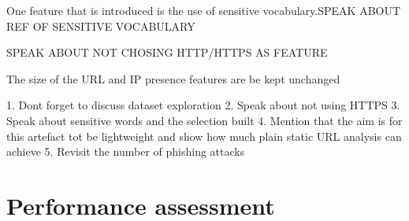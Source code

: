 One feature that is introduced is the use of sensitive vocabulary.SPEAK ABOUT REF OF SENSITIVE VOCABULARY

SPEAK ABOUT NOT CHOSING HTTP/HTTPS AS FEATURE

The size of the URL and IP presence features are be kept unchanged


1. Dont forget to discuss dataset exploration
2. Speak about not using HTTPS
3. Speak about sensitive words and the selection built
4. Mention that the aim is for this artefact tot be lightweight and show how much plain static URL analysis can achieve
5. Revisit the number of phishing attacks

\section{Performance assessment}


\iffalse
You should always start with an overview (Heading 2 style) to tell what this chapter is about and finish with a summary (Heading 2 style) to tell what has been covered in this chapter.

The Design and Implementation chapter should explain the design technique chosen and justify why it is appropriate, depending on the development methodology.  Suitable diagram-techniques (e.g. UML, other drawings) should be used where appropriate. For the Implementation part, it should talk about the technical realisation of the concepts and ideas developed earlier. It is used to describe the system at a finer level of technical details, down to the code level. However, do not attempt to describe all the code in the system, and do not include large pieces of code in this section. 

You should highlight the pieces of code which are critical to the system or worth to be noted. For example, the creation and/or implementation of core algorithms that make the system functional or some methods/ways you have used which are non-standard or innovative in the system implementation. You should also mention any unforeseen problems you encountered when implementing the system and how and to what extend you overcame them.

Appropriate testing must also be included in this section
\fi